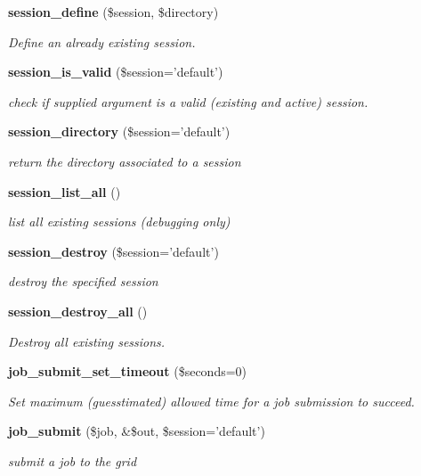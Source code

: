 \begin{CompactItemize}
{\bf session\_\-define} (\$session, \$directory)
\begin{CompactList}\small\item\em Define an already existing session. \item\end{CompactList}\item 
{\bf session\_\-is\_\-valid} (\$session='default')
\begin{CompactList}\small\item\em check if supplied argument is a valid (existing and active) session. \item\end{CompactList}\item 
{\bf session\_\-directory} (\$session='default')
\begin{CompactList}\small\item\em return the directory associated to a session \item\end{CompactList}\item 
{\bf session\_\-list\_\-all} ()
\begin{CompactList}\small\item\em list all existing sessions (debugging only) \item\end{CompactList}\item 
{\bf session\_\-destroy} (\$session='default')
\begin{CompactList}\small\item\em destroy the specified session \item\end{CompactList}\item 
{\bf session\_\-destroy\_\-all} ()
\begin{CompactList}\small\item\em Destroy all existing sessions. \item\end{CompactList}\item 
{\bf job\_\-submit\_\-set\_\-timeout} (\$seconds=0)
\begin{CompactList}\small\item\em Set maximum (guesstimated) allowed time for a job submission to succeed. \item\end{CompactList}\item 
{\bf job\_\-submit} (\$job, \&\$out, \$session='default')
\begin{CompactList}\small\item\em submit a job to the grid \item\end{CompactList}\item 

\end{CompactItemize}
